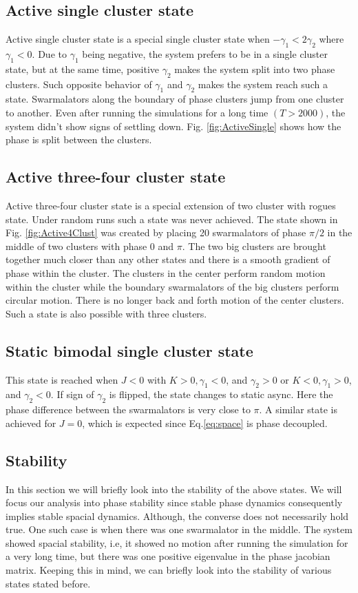 \documentclass[twocolumn,10pt]{asme2ej}
\begin{document}
{    \subsection{Active single cluster state}
    {
        Active single cluster state is a special single cluster state when \(-\gamma_1 < 2\gamma_2\) where \(\gamma_1 < 0\). Due to \(\gamma_1\) being negative, the system prefers to be in a single cluster state, but at the same time, positive \(\gamma_2\) makes the system split into two phase clusters. Such opposite behavior of \(\gamma_1\) and \(\gamma_2\) makes the system reach such a state. Swarmalators along the boundary of phase clusters jump from one cluster to another. Even after running the simulations for a long time \((T > 2000)\), the system didn't show signs of settling down. Fig. \ref{fig:ActiveSingle} shows how the phase is split between the clusters. 
    }
    \subsection{Active three-four cluster state}
    {
        Active three-four cluster state is a special extension of two cluster with rogues state. Under random runs such a state was never achieved. The state shown in Fig. \ref{fig:Active4Clust} was created by placing 20 swarmalators of phase \(\pi/2\) in the middle of two clusters with phase \(0\) and \(\pi\). The two big clusters are brought together much closer than any other states and there is a smooth gradient of phase within the cluster. The clusters in the center perform random motion within the cluster while the boundary swarmalators of the big clusters perform circular motion. There is no longer back and forth motion of the center clusters. Such a state is also possible with three clusters.
    }
    \subsection{Static bimodal single cluster state}
    {
        This state is reached when \(J < 0\) with \(K > 0, \gamma_1 < 0\), and \(\gamma_2 > 0\) or \(K < 0, \gamma_1>0\), and \(\gamma_2 < 0\). If sign of \(\gamma_2\) is flipped, the state changes to static async. Here the phase difference between the swarmalators is very close to \(\pi\). A similar state is achieved for \(J = 0\), which is expected since Eq.\ref{eq:space} is phase decoupled. 
    }
    \subsection{Stability}
    {
        In this section we will briefly look into the stability of the above states. We will focus our analysis into phase stability since stable phase dynamics consequently implies stable spacial dynamics. Although, the converse does not necessarily hold true. One such case is when there was one swarmalator in the middle. The system showed spacial stability, i.e, it showed no motion after running the simulation for a very long time, but there was one positive eigenvalue in the phase jacobian matrix. Keeping this in mind, we can briefly look into the stability of various states stated before. 
        
}}
\end{document}
